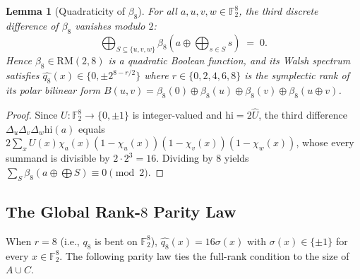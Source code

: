 \documentclass[11pt]{article}
\newtheorem{lemma}[theorem]{Lemma}
\theoremstyle{definition}
\newcommand{\F}{\mathbb{F}}
\begin{document}
\begin{lemma}[Quadraticity of $\beta_8$]
\label{lem:beta8-cube}
For all $a, u, v, w \in \F_2^8$, the third discrete difference of $\beta_8$ vanishes modulo $2$:
\[
  \bigoplus_{S \subseteq \{u, v, w\}} \beta_8\!\left(a \oplus \bigoplus_{s \in S} s\right) \;=\; 0.
\]
Hence $\beta_8 \in \mathrm{RM}(2, 8)$ is a quadratic Boolean function, and its Walsh spectrum satisfies $\widehat{q_8}(x) \in \{0, \pm 2^{8 - r/2}\}$ where $r \in \{0, 2, 4, 6, 8\}$ is the symplectic rank of its polar bilinear form $B(u, v) = \beta_8(0) \oplus \beta_8(u) \oplus \beta_8(v) \oplus \beta_8(u \oplus v)$.
\end{lemma}
\begin{proof}
Since $U : \F_2^8 \to \{0, \pm 1\}$ is integer-valued and $\mathrm{hi} = 2\widehat{U}$, the third difference $\Delta_u \Delta_v \Delta_w \mathrm{hi}(a)$ equals $2 \sum_x U(x)\chi_a(x)(1-\chi_u(x))(1-\chi_v(x))(1-\chi_w(x))$, whose every summand is divisible by $2 \cdot 2^3 = 16$. Dividing by $8$ yields $\sum_{S} \beta_8(a \oplus \bigoplus S) \equiv 0 \pmod 2$.
\end{proof}

\subsection{The Global Rank-$8$ Parity Law}

When $r = 8$ (i.e., $q_8$ is bent on $\F_2^8$), $\widehat{q_8}(x) = 16\sigma(x)$ with $\sigma(x) \in \{\pm 1\}$ for every $x \in \F_2^8$.
The following parity law ties the full-rank condition to the size of $A \cup C$.
\end{document}
